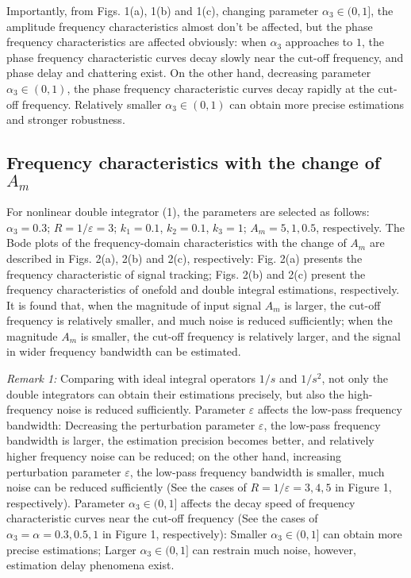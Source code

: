 \documentclass[10pt,journal]{IEEEtran}
\begin{document}
Importantly, from Figs. 1(a), 1(b) and 1(c), changing parameter $\alpha
_{3}\in (0,1]$, the amplitude frequency characteristics almost don't be
affected, but the phase frequency characteristics are affected obviously:
when $\alpha _{3}$ approaches to $1$, the phase frequency characteristic
curves decay slowly near the cut-off frequency, and phase delay and
chattering exist. On the other hand, decreasing parameter $\alpha _{3}\in
(0,1)$, the phase frequency characteristic curves decay rapidly at the
cut-off frequency. Relatively smaller $\alpha _{3}\in (0,1)$ can obtain more
precise estimations and stronger robustness.

\subsection{Frequency characteristics with the change of $A_{m}$}

For nonlinear double integrator (1), the parameters are selected as follows:
$\alpha _{3}=0.3$; $R=1/\varepsilon =3$; $k_{1}=0.1$, $k_{2}=0.1$, $k_{3}=1$; $A_{m}=5,1,0.5$, respectively. The Bode plots of the frequency-domain
characteristics with the change of $A_{m}$ are described in Figs. 2(a), 2(b)
and 2(c), respectively: Fig. 2(a) presents the frequency characteristic of
signal tracking; Figs. 2(b) and 2(c) present the frequency characteristics
of onefold and double integral estimations, respectively. It is found that,
when the magnitude of input signal $A_{m}$ is larger, the cut-off frequency
is relatively smaller, and much noise is reduced sufficiently; when the
magnitude $A_{m}$ is smaller, the cut-off frequency is relatively larger,
and the signal in wider frequency bandwidth can be estimated.

\bigskip

\emph{Remark 1:} Comparing with ideal integral operators $1/s$ and $1/s^{2}$, not only the double integrators can obtain their estimations precisely,
but also the high-frequency noise is reduced sufficiently. Parameter $\varepsilon $ affects the low-pass frequency bandwidth: Decreasing the
perturbation parameter $\varepsilon $, the low-pass frequency bandwidth is
larger, the estimation precision becomes better, and relatively higher
frequency noise can be reduced; on the other hand, increasing perturbation
parameter $\varepsilon $, the low-pass frequency bandwidth is smaller, much
noise can be reduced sufficiently (See the cases of $R=1/\varepsilon =3,4,5$
in Figure 1, respectively). Parameter $\alpha _{3}\in (0,1]$ affects the
decay speed of frequency characteristic curves near the cut-off frequency
(See the cases of $\alpha _{3}=\alpha =0.3,0.5,1$ in Figure 1,
respectively): Smaller $\alpha _{3}\in (0,1]$ can obtain more precise
estimations; Larger $\alpha _{3}\in (0,1]$ can restrain much noise, however,
estimation delay phenomena exist.
\end{document}
